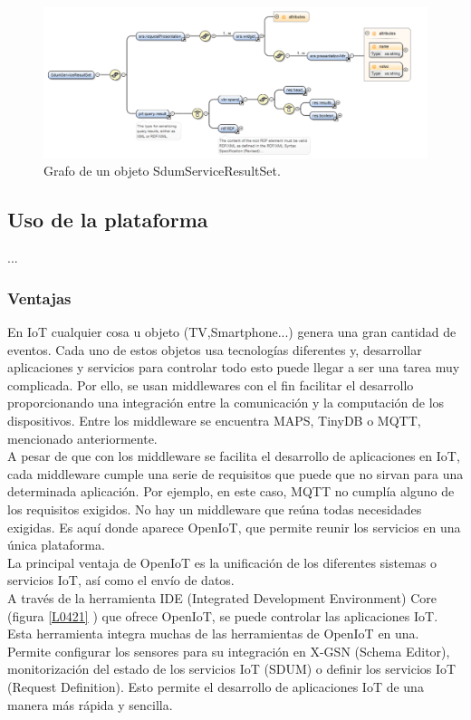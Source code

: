 \documentclass[12pt, twoside]{book}
\begin{document}
\begin{figure}[H]
\centering
\includegraphics[scale=0.5]{images/sdum_service}
\caption{Grafo de un objeto SdumServiceResultSet.}\label{L0422}
\end{figure}
\subsection{Uso de la plataforma}
...
\subsubsection*{Ventajas}
En IoT cualquier cosa u objeto (TV,Smartphone...) genera una gran cantidad de eventos. Cada uno de estos objetos usa tecnologías diferentes y, desarrollar aplicaciones y servicios para controlar todo esto puede llegar a ser una tarea muy complicada. Por ello, se usan middlewares con el fin facilitar el desarrollo proporcionando una integración entre la comunicación y la computación de los dispositivos. Entre los middleware se encuentra MAPS, TinyDB o MQTT, mencionado anteriormente.\\

A pesar de que con los middleware se facilita el desarrollo de aplicaciones en IoT, cada middleware cumple una serie de requisitos que puede que no sirvan para una determinada aplicación. Por ejemplo, en este caso, MQTT no cumplía alguno de los requisitos exigidos. No hay un middleware que reúna todas necesidades exigidas. Es aquí donde aparece OpenIoT, que permite reunir los servicios en una única plataforma.\\

La principal ventaja de OpenIoT es la unificación de los diferentes sistemas o servicios IoT, así como el envío de datos.\\

A través de la herramienta IDE (Integrated Development Environment) Core (figura \ref{L0421} ) que ofrece OpenIoT, se puede controlar las aplicaciones IoT. Esta herramienta integra muchas de las herramientas de OpenIoT en una. Permite configurar los sensores para su integración en X-GSN (Schema Editor), monitorización del estado de los servicios IoT (SDUM) o definir los servicios IoT (Request Definition). Esto permite el desarrollo de aplicaciones IoT de una manera más rápida y sencilla.\\
\end{document}
